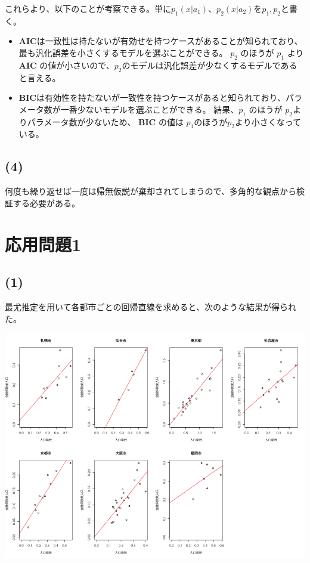 \documentclass[a4j,xelatex,ja=standard,jafont=hiragino-pron, 10pt]{bxjsarticle}
\let\origfigure=\figure
\let\endorigfigure=\endfigure
\renewenvironment{figure}[1][]{%
  \origfigure[H]
}{%
  \endorigfigure
}
\begin{document}
これらより、以下のことが考察できる。単に$p_1(x|a_1)$、$p_2(x|a_2)$を$p_1, p_2$と書く。

\begin{itemize}
  \item
    \textbf{AIC}は一致性は持たないが有効せを持つケースがあることが知られており、最も汎化誤差を小さくするモデルを選ぶことができる。
    $p_2$ のほうが $p_1$ より \textbf{AIC} の値が小さいので、$p_2$のモデルは汎化誤差が少なくするモデルであると言える。
  \item
    \textbf{BIC}は有効性を持たないが一致性を持つケースがあると知られており、パラメータ数が一番少ないモデルを選ぶことができる。
    結果、$p_1$ のほうが $p_2$よりパラメータ数が少ないため、 \textbf{BIC} の値は $p_1$のほうが$p_2$より小さくなっている。
\end{itemize}

\subsection*{(4)}

何度も繰り返せば一度は帰無仮説が棄却されてしまうので、多角的な観点から検証する必要がある。

\section*{応用問題1}

\subsection*{(1)}\label{section}

最尤推定を用いて各都市ごとの回帰直線を求めると、次のような結果が得られた。

\begin{figure}
\centering
\includegraphics[width=14cm]{../src/output/image/regression.png}
\caption{最尤推定法による推定}
\end{figure}
\end{document}

